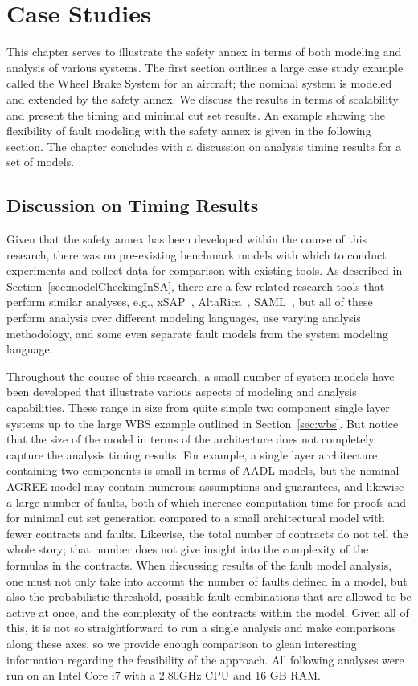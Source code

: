 \chapter{Case Studies}
\label{chap:caseStudies}
This chapter serves to illustrate the safety annex in terms of both modeling and analysis of various systems. The first section outlines a large case study example called the Wheel Brake System for an aircraft; the nominal system is modeled and extended by the safety annex. We discuss the results in terms of scalability and present the timing and minimal cut set results. An example showing the flexibility of fault modeling with the safety annex is given in the following section. The chapter concludes with a discussion on analysis timing results for a set of models. 




\section{Discussion on Timing Results}
\label{sec:timing}
Given that the safety annex has been developed within the course of this research, there was no pre-existing benchmark models with which to conduct experiments and collect data for comparison with existing tools. As described in Section~\ref{sec:modelCheckingInSA}, there are a few related research tools that perform similar analyses, e.g., xSAP~\cite{DBLP:conf/tacas/BittnerBCCGGMMZ16}, AltaRica~\cite{signoret1998altarica}, SAML~\cite{Gudemann:2010:FQQ:1909626.1909813}, but all of these perform analysis over different modeling languages, use varying analysis methodology, and some even separate fault models from the system modeling language.

Throughout the course of this research, a small number of system models have been developed that illustrate various aspects of modeling and analysis capabilities. These range in size from quite simple two component single layer systems up to the large WBS example outlined in Section~\ref{sec:wbs}. But notice that the size of the model in terms of the architecture does not completely capture the analysis timing results. For example, a single layer architecture containing two components is small in terms of AADL models, but the nominal AGREE model may contain numerous assumptions and guarantees, and likewise a large number of faults, both of which increase computation time for proofs and for minimal cut set generation compared to a small architectural model with fewer contracts and faults. Likewise, the total number of contracts do not tell the whole story; that number does not give insight into the complexity of the formulas in the contracts. When discussing results of the fault model analysis, one must not only take into account the number of faults defined in a model, but also the probabilistic threshold, possible fault combinations that are allowed to be active at once, and the complexity of the contracts within the model. Given all of this, it is not so straightforward to run a single analysis and make comparisons along these axes, so we provide enough comparison to glean interesting information regarding the feasibility of the approach. All following analyses were run on an Intel Core i7 with a 2.80GHz CPU and 16 GB RAM. 


